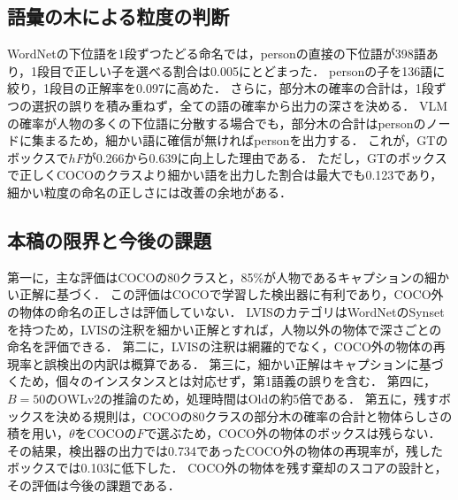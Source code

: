 \subsection{語彙の木による粒度の判断}
WordNetの下位語を1段ずつたどる命名では，personの直接の下位語が398語あり，1段目で正しい子を選べる割合は0.005にとどまった．
personの子を136語に絞り，1段目の正解率を0.097に高めた．
さらに，部分木の確率の合計は，1段ずつの選択の誤りを積み重ねず，全ての語の確率から出力の深さを決める．
VLMの確率が人物の多くの下位語に分散する場合でも，部分木の合計はpersonのノードに集まるため，細かい語に確信が無ければpersonを出力する．
これが，GTのボックスで$ hF $が0.266から0.639に向上した理由である．
ただし，GTのボックスで正しくCOCOのクラスより細かい語を出力した割合は最大でも0.123であり，細かい粒度の命名の正しさには改善の余地がある．

\subsection{本稿の限界と今後の課題}
第一に，主な評価はCOCOの80クラスと，85\%が人物であるキャプションの細かい正解に基づく．
この評価はCOCOで学習した検出器に有利であり，COCO外の物体の命名の正しさは評価していない．
LVISのカテゴリはWordNetのSynsetを持つため，LVISの注釈を細かい正解とすれば，人物以外の物体で深さごとの命名を評価できる．
第二に，LVISの注釈は網羅的でなく，COCO外の物体の再現率と誤検出の内訳は概算である．
第三に，細かい正解はキャプションに基づくため，個々のインスタンスとは対応せず，第1語義の誤りを含む．
第四に，$ B = 50 $のOWLv2の推論のため，処理時間はOldの約5倍である．
第五に，残すボックスを決める規則は，COCOの80クラスの部分木の確率の合計と物体らしさの積を用い，$ \theta $をCOCOの$ F $で選ぶため，COCO外の物体のボックスは残らない．
その結果，検出器の出力では0.734であったCOCO外の物体の再現率が，残したボックスでは0.103に低下した．
COCO外の物体を残す棄却のスコアの設計と，その評価は今後の課題である．
